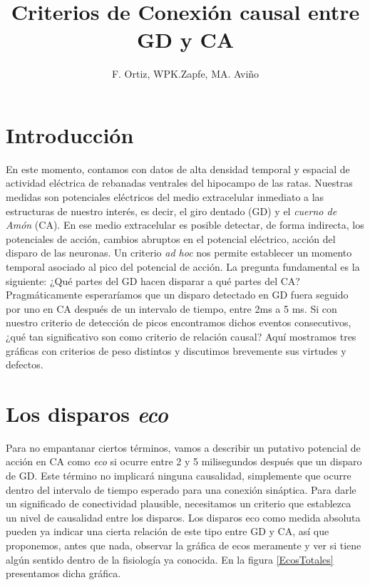 \documentclass{article}
\title{Criterios de Conexión causal entre GD y CA}
\author{F. Ortiz,  WPK.Zapfe,  MA. Aviño }
\begin{document}
\maketitle


\section{Introducción}

En este momento, contamos con datos de alta densidad temporal
y espacial de actividad eléctrica de rebanadas ventrales del 
hipocampo de las ratas. Nuestras medidas son potenciales eléctricos
 del medio extracelular inmediato a las estructuras de nuestro
interés, es decir, el giro dentado (GD) y el \emph{cuerno de Amón} (CA). 
En ese medio extracelular es posible detectar, de forma indirecta,
los potenciales de acción, cambios abruptos en el potencial
eléctrico, acción del disparo de las neuronas. Un criterio \emph{ad hoc}
nos permite establecer un momento temporal asociado al pico
del potencial de acción. La pregunta fundamental es la siguiente:
¿Qué partes del GD hacen disparar a qué partes del CA? 
Pragmáticamente esperaríamos que un disparo detectado en GD fuera seguido
por uno en CA después de un intervalo de tiempo, entre 2ms  a 5 ms.  
Si con nuestro criterio de detección de picos encontramos dichos eventos
consecutivos, ¿qué tan significativo son como criterio de relación causal?
Aquí mostramos tres gráficas con criterios de peso distintos y 
discutimos brevemente sus virtudes y defectos.

\section{Los disparos \emph{eco}}

Para no empantanar ciertos términos, vamos a describir un putativo
potencial de acción en CA como \emph{eco} si ocurre entre 
2 y 5 milisegundos después que un disparo de GD. Este término
no implicará ninguna causalidad, simplemente que ocurre dentro
del intervalo de tiempo esperado para una conexión sináptica.
Para darle un significado de conectividad plausible, necesitamos
un criterio que establezca un nivel de causalidad entre los disparos.
Los disparos eco como medida absoluta pueden ya indicar una cierta
relación de este tipo entre GD y CA, así que proponemos, antes
que nada, observar la gráfica de ecos meramente y ver si tiene
algún sentido dentro de la fisiología ya conocida. En la figura 
\ref{EcosTotales} presentamos dicha gráfica. 
\end{document}
